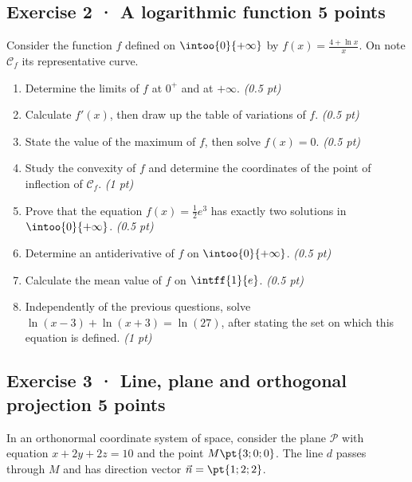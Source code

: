 \subsection*{Exercise 2 · A logarithmic function \hfill 5 points}Consider the function $f$ defined on $\intoo{0}{+\infty}$ by $f(x)=\frac{4+\ln x}x$. On note $\mathcal C_f$ its representative curve.

\begin{enumerate}

\item Determine the limits of $f$ at $0^+$ and at $+\infty$. \hfill\textit{(0.5 pt)}

\item Calculate $f' (x)$, then draw up the table of variations of $f$. \hfill\textit{(0.5 pt)}

\item State the value of the maximum of $f$, then solve $f(x)=0$. \hfill\textit{(0.5 pt)}

\item Study the convexity of $f$ and determine the coordinates of the point of inflection of $\mathcal C_f$. \hfill\textit{(1 pt)}

\item Prove that the equation $f(x)=\frac12 e^{3}$ has exactly two solutions in $\intoo{0}{+\infty}$. \hfill\textit{(0.5 pt)}

\item Determine an antiderivative of $f$ on $\intoo{0}{+\infty}$. \hfill\textit{(0.5 pt)}

\item Calculate the mean value of $f$ on $\intff{1}{e}$. \hfill\textit{(0.5 pt)}

\item Independently of the previous questions, solve $\ln(x-3)+\ln(x+3)=\ln(27)$, after stating the set on which this equation is defined. \hfill\textit{(1 pt)}

\end{enumerate}

\mxnewpage{}

\subsection*{Exercise 3 · Line, plane and orthogonal projection \hfill 5 points}In an orthonormal coordinate system of space, consider the plane $\mathcal P$ with equation $x+2y+2z=10$ and the point $M\pt{3;0;0}$. The line $d$ passes through $M$ and has direction vector $\vec n=\pt{1;2;2}$.

